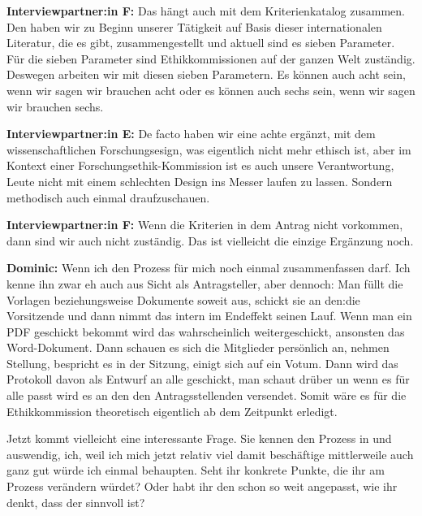 \documentclass[a4paper,12pt,twoside]{scrreprt}
\begin{document}
\textbf{Interviewpartner:in F:} Das hängt auch mit dem Kriterienkatalog zusammen. Den haben wir zu Beginn unserer Tätigkeit auf Basis dieser internationalen Literatur, die es gibt, zusammengestellt und aktuell sind es sieben Parameter. Für die sieben Parameter sind Ethikkommissionen auf der ganzen Welt zuständig. Deswegen arbeiten wir mit diesen sieben Parametern. Es können auch acht sein, wenn wir sagen wir brauchen acht oder es können auch sechs sein, wenn wir sagen wir brauchen sechs.

\textbf{Interviewpartner:in E:} De facto haben wir eine achte ergänzt, mit dem wissenschaftlichen Forschungsesign, was eigentlich nicht mehr ethisch ist, aber im Kontext einer Forschungsethik-Kommission ist es auch unsere Verantwortung, Leute nicht mit einem schlechten Design ins Messer laufen zu lassen. Sondern methodisch auch einmal draufzuschauen.

\textbf{Interviewpartner:in F:} Wenn die Kriterien in dem Antrag nicht vorkommen, dann sind wir auch nicht zuständig. Das ist vielleicht die einzige Ergänzung noch.

\textbf{Dominic:} Wenn ich den Prozess für mich noch einmal zusammenfassen darf. Ich kenne ihn zwar eh auch aus Sicht als Antragsteller, aber dennoch: Man füllt die Vorlagen beziehungsweise Dokumente soweit aus, schickt sie an den:die Vorsitzende und dann nimmt das intern im Endeffekt seinen Lauf. Wenn man ein PDF geschickt bekommt wird das wahrscheinlich weitergeschickt, ansonsten das Word-Dokument. Dann schauen es sich die Mitglieder persönlich an, nehmen Stellung, bespricht es in der Sitzung, einigt sich auf ein Votum. Dann wird das Protokoll davon als Entwurf an alle geschickt, man schaut drüber un wenn es für alle passt wird es an den den Antragsstellenden versendet. Somit wäre es für die Ethikkommission theoretisch eigentlich ab dem Zeitpunkt erledigt.

Jetzt kommt vielleicht eine interessante Frage. Sie kennen den Prozess in und auswendig, ich, weil ich mich jetzt relativ viel damit beschäftige mittlerweile auch ganz gut würde ich einmal behaupten. Seht ihr konkrete Punkte, die ihr am Prozess verändern würdet? Oder habt ihr den schon so weit angepasst, wie ihr denkt, dass der sinnvoll ist?
\end{document}
